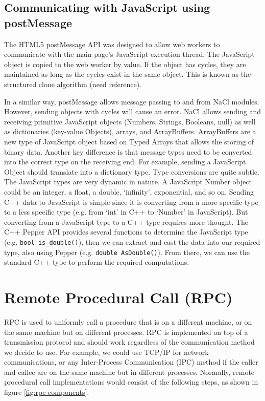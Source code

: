 \subsection{Communicating with JavaScript using postMessage}
The HTML5 postMessage API was designed to allow web workers to communicate with the main page's JavaScript execution thread. The JavaScript object is copied to the web worker by value. If the object has cycles, they are maintained as long as the cycles exist in the same object. This is known as the structured clone algorithm (need reference). 

In a similar way, postMessage allows message passing to and from NaCl modules. However, sending objects with cycles will cause an error. NaCl allows sending and receiving primitive JavaScript objects (Numbers, Strings, Booleans, null) as well as dictionaries (key-value Objects), arrays, and ArrayBuffers. ArrayBuffers are a new type of JavaScript object based on Typed Arrays \cite{typedarraysw3c} that allows the storing of binary data. Another key difference is that message types need to be converted into the correct type on the receiving end. For example, sending a JavaScript Object should translate into a dictionary type. Type conversions are quite subtle. The JavaScript types are very dynamic in nature. A JavaScript Number object could be an integer, a float, a double, `infinity', exponential, and so on. Sending C++ data to JavaScript is simple since it is converting from a more specific type to a less specific type (e.g. from `int' in C++ to `Number' in JavaScript). But converting from a JavaScript type to a C++ type requires more thought. The C++ Pepper API provides several functions to determine the JavaScript type (e.g. \verb+bool is_double()+), then we can extract and cast the data into our required type, also using Pepper (e.g. \verb+double AsDouble()+). From there, we can use the standard C++ type to perform the required computations.


\section{Remote Procedural Call (RPC)}
RPC is used to uniformly call a procedure that is on a different machine, or on the same machine but on different processes. RPC is implemented on top of a transmission protocol and should work regardless of the communication method we decide to use. For example, we could use TCP/IP for network communications, or any Inter-Process Communication (IPC) method if the caller and callee are on the same machine but in different processes. Normally, remote procedural call implementations would consist of the following steps, as shown in figure \ref{fig:rpc-components}.

